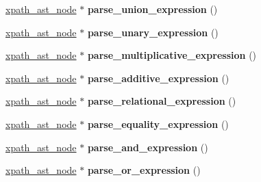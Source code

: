 \begin{DoxyCompactItemize}
\item 
\hypertarget{structxpath__parser_a2b5326e67d26a880cf29343a61e23891}{\hyperlink{classxpath__ast__node}{xpath\-\_\-ast\-\_\-node} $\ast$ {\bfseries parse\-\_\-union\-\_\-expression} ()}\label{structxpath__parser_a2b5326e67d26a880cf29343a61e23891}

\item 
\hypertarget{structxpath__parser_af5f2714594608f2536f3324c27ce7969}{\hyperlink{classxpath__ast__node}{xpath\-\_\-ast\-\_\-node} $\ast$ {\bfseries parse\-\_\-unary\-\_\-expression} ()}\label{structxpath__parser_af5f2714594608f2536f3324c27ce7969}

\item 
\hypertarget{structxpath__parser_a384f3f30c6182714b02df188314abb95}{\hyperlink{classxpath__ast__node}{xpath\-\_\-ast\-\_\-node} $\ast$ {\bfseries parse\-\_\-multiplicative\-\_\-expression} ()}\label{structxpath__parser_a384f3f30c6182714b02df188314abb95}

\item 
\hypertarget{structxpath__parser_a7744f7e05f69fa9c073d7a241036ee08}{\hyperlink{classxpath__ast__node}{xpath\-\_\-ast\-\_\-node} $\ast$ {\bfseries parse\-\_\-additive\-\_\-expression} ()}\label{structxpath__parser_a7744f7e05f69fa9c073d7a241036ee08}

\item 
\hypertarget{structxpath__parser_a2a3164bf53415c43fbe0b5293d8c9efe}{\hyperlink{classxpath__ast__node}{xpath\-\_\-ast\-\_\-node} $\ast$ {\bfseries parse\-\_\-relational\-\_\-expression} ()}\label{structxpath__parser_a2a3164bf53415c43fbe0b5293d8c9efe}

\item 
\hypertarget{structxpath__parser_aa63ac82f43eaa1c9f8769174adc87f48}{\hyperlink{classxpath__ast__node}{xpath\-\_\-ast\-\_\-node} $\ast$ {\bfseries parse\-\_\-equality\-\_\-expression} ()}\label{structxpath__parser_aa63ac82f43eaa1c9f8769174adc87f48}

\item 
\hypertarget{structxpath__parser_a84bbefffccb9fe91fec5c82aba2b6f02}{\hyperlink{classxpath__ast__node}{xpath\-\_\-ast\-\_\-node} $\ast$ {\bfseries parse\-\_\-and\-\_\-expression} ()}\label{structxpath__parser_a84bbefffccb9fe91fec5c82aba2b6f02}

\item 
\hypertarget{structxpath__parser_a44768d5969dfb9b0a44e845551813c77}{\hyperlink{classxpath__ast__node}{xpath\-\_\-ast\-\_\-node} $\ast$ {\bfseries parse\-\_\-or\-\_\-expression} ()}\label{structxpath__parser_a44768d5969dfb9b0a44e845551813c77}


\end{DoxyCompactItemize}
